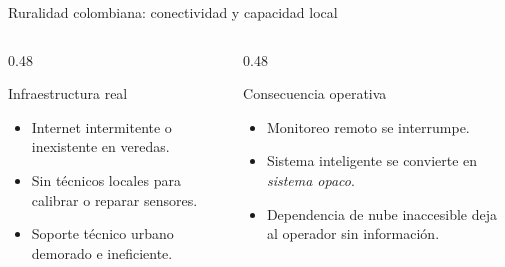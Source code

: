 \documentclass[aspectratio=169, 11pt]{beamer}
\begin{document}
\begin{frame}{Ruralidad colombiana: conectividad y capacidad local}
    \begin{columns}[T]
        \begin{column}{0.48\textwidth}
            \begin{alertblock}{Infraestructura real}
                \begin{itemize}
                    \item Internet intermitente o inexistente en veredas.
                    \item Sin t\'{e}cnicos locales para calibrar o reparar sensores.
                    \item Soporte t\'{e}cnico urbano demorado e ineficiente.
                \end{itemize}
            \end{alertblock}
        \end{column}
        \begin{column}{0.48\textwidth}
            \begin{alertblock}{Consecuencia operativa}
                \begin{itemize}
                    \item Monitoreo remoto se interrumpe.
                    \item Sistema inteligente se convierte en \textit{sistema opaco}.
                    \item Dependencia de nube inaccesible deja al operador sin informaci\'{o}n.
                \end{itemize}
            \end{alertblock}
        \end{column}
    \end{columns}
\end{frame}
\end{document}
